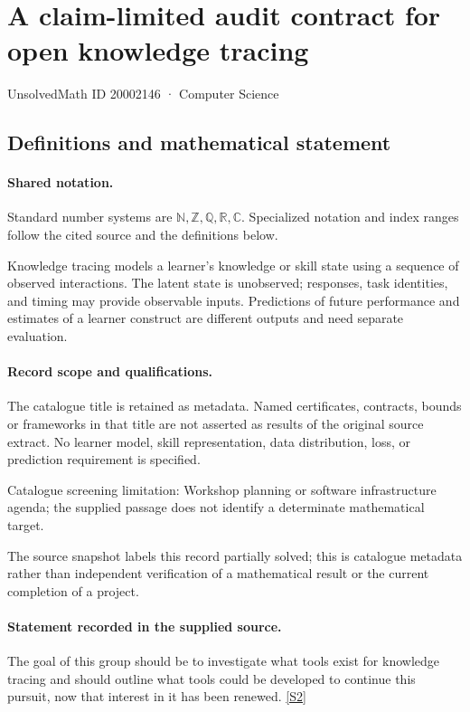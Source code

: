 \documentclass[11pt]{article}
\newcommand{\sref}[2]{\hyperlink{source:#1:#2}{[S#2]}}
\begin{document}
\setcounter{section}{20002145}
\section{A claim-limited audit contract for open knowledge tracing}\label{20002146}
{\small\sffamily UnsolvedMath ID 20002146 · Computer Science}
\subsection{Definitions and mathematical statement}

\paragraph{Shared notation.}Standard number systems are $\mathbb N,\mathbb Z,\mathbb Q,\mathbb R,\mathbb C$. Specialized notation and index ranges follow the cited source and the definitions below.


Knowledge tracing models a learner's knowledge or skill state using a sequence of observed interactions. The latent state is unobserved; responses, task identities, and timing may provide observable inputs. Predictions of future performance and estimates of a learner construct are different outputs and need separate evaluation.
\paragraph{Record scope and qualifications.}
The catalogue title is retained as metadata. Named certificates, contracts, bounds or frameworks in that title are not asserted as results of the original source extract.
No learner model, skill representation, data distribution, loss, or prediction requirement is specified.

Catalogue screening limitation: Workshop planning or software infrastructure agenda; the supplied passage does not identify a determinate mathematical target.

The source snapshot labels this record partially solved; this is catalogue metadata rather than independent verification of a mathematical result or the current completion of a project.
\paragraph{Statement recorded in the supplied source.}
The goal of this group should be to investigate what tools exist for knowledge tracing and should outline what tools could be developed to continue this pursuit, now that interest in it has been renewed. \sref{20002146}{2}
\end{document}
